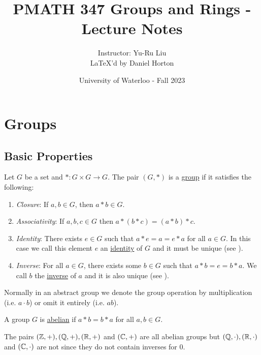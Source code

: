 \documentclass[11pt]{article}
\begin{document}
\thispagestyle{empty}
\title{PMATH 347 Groups and Rings - Lecture Notes}
\author{Instructor: Yu-Ru Liu \\ \LaTeX'd by Daniel Horton}
\date{University of Waterloo - Fall 2023}
\maketitle
\pagebreak

\tableofcontents
\pagebreak

\section{Groups}

\subsection{Basic Properties}

\begin{definition}[Groups]
    Let $G$ be a set and $*:G\times G\to G$. The pair $(G,*)$ is a \ul{group} if it satisfies the following:
    \begin{enumerate}
        \item\emph{Closure}: If $a,b\in G$, then $a*b\in G$.
        \item\emph{Associativity}: If $a,b,c\in G$ then $a*(b*c)=(a*b)*c$.
        \item\emph{Identity}: There exists $e\in G$ such that $a*e=a=e*a$ for all $a\in G$. In this case we call this element $e$ an \ul{identity} of $G$ and it must be unique (see ).
        \item\emph{Inverse}: For all $a\in G$, there exists some $b\in G$ such that $a*b=e=b*a$. We call $b$ the \ul{inverse} of $a$ and it is also unique (see ).
    \end{enumerate}
\end{definition}

\begin{notation}
    Normally in an abstract group we denote the group operation by multiplication (i.e. $a\cdot b$) or omit it entirely (i.e. $ab$).
\end{notation}

\begin{definition}
    A group $G$ is \ul{abelian} if $a*b=b*a$ for all $a,b\in G$.
\end{definition}

\begin{example}
    The pairs $(\mathbb{Z},+),(\mathbb{Q},+),(\mathbb{R},+)$ and $(\mathbb{C},+)$ are all abelian groups but $(\mathbb{Q},\cdot),(\mathbb{R},\cdot)$ and $(\mathbb{C},\cdot)$ are not since they do not contain inverses for 0.
\end{example}
\end{document}
